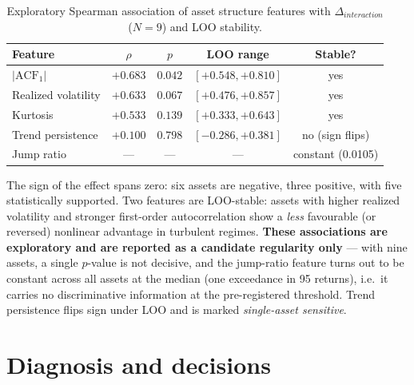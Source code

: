 \documentclass[preprint,12pt]{elsarticle}
\begin{document}
\begin{table}[!t]
\centering
\small
\caption{Exploratory Spearman association of asset structure features with
$\Delta_{interaction}$ ($N=9$) and LOO stability.}
\label{tab:assoc}
\begin{tabular}{@{}lcccc@{}}
\toprule
Feature & $\rho$ & $p$ & LOO range & Stable? \\
\midrule
$|\mathrm{ACF}_1|$      & $+0.683$ & $0.042$ & $[+0.548,+0.810]$ & yes \\
Realized volatility     & $+0.633$ & $0.067$ & $[+0.476,+0.857]$ & yes \\
Kurtosis                & $+0.533$ & $0.139$ & $[+0.333,+0.643]$ & yes \\
Trend persistence       & $+0.100$ & $0.798$ & $[-0.286,+0.381]$ & no (sign flips) \\
Jump ratio              & ---      & ---     & --- & constant (0.0105) \\
\bottomrule
\end{tabular}
\end{table}

The sign of the effect spans zero: six assets are negative, three positive, with five
statistically supported. Two features are LOO-stable: assets with higher realized volatility and
stronger first-order autocorrelation show a \emph{less} favourable (or reversed) nonlinear
advantage in turbulent regimes. \textbf{These associations are exploratory and are reported as a
candidate regularity only} --- with nine assets, a single $p$-value is not decisive, and the
jump-ratio feature turns out to be constant across all assets at the median (one exceedance in
95 returns), i.e.\ it carries no discriminative information at the pre-registered threshold.
Trend persistence flips sign under LOO and is marked \emph{single-asset sensitive}.

\section{Diagnosis and decisions}
\label{sec:diagnosis}
\end{document}
